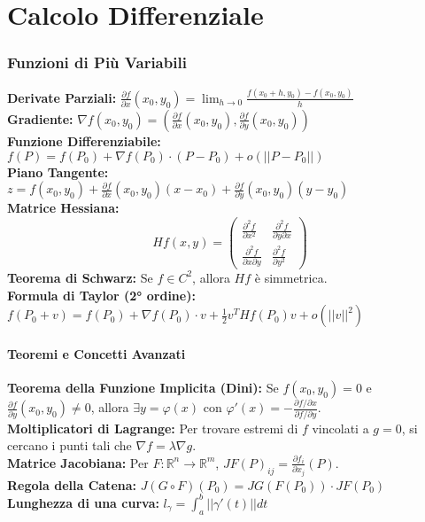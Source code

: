 \documentclass[12pt, a4paper]{article}
\begin{document}
\part{Calcolo Differenziale}

\section{Funzioni di Più Variabili}
\textbf{Derivate Parziali:} $\frac{\partial f}{\partial x}(x_0, y_0) = \lim_{h \to 0} \frac{f(x_0+h, y_0) - f(x_0, y_0)}{h}$  \\
\textbf{Gradiente:} $\nabla f(x_0, y_0) = \left(\frac{\partial f}{\partial x}(x_0, y_0), \frac{\partial f}{\partial y}(x_0, y_0)\right)$  \\
\textbf{Funzione Differenziabile:} $f(P) = f(P_0) + \nabla f(P_0) \cdot (P-P_0) + o(||P-P_0||)$  \\
\textbf{Piano Tangente:} $z = f(x_0, y_0) + \frac{\partial f}{\partial x}(x_0, y_0)(x-x_0) + \frac{\partial f}{\partial y}(x_0, y_0)(y-y_0)$  \\
\textbf{Matrice Hessiana:}
\begin{equation}
Hf(x,y) = \begin{pmatrix} \frac{\partial^2 f}{\partial x^2} & \frac{\partial^2 f}{\partial y \partial x} \\ \frac{\partial^2 f}{\partial x \partial y} & \frac{\partial^2 f}{\partial y^2} \end{pmatrix}
\end{equation}
\textbf{Teorema di Schwarz:} Se $f \in C^2$, allora $Hf$ è simmetrica.  \\
\textbf{Formula di Taylor (2° ordine):} $f(P_0+v) = f(P_0) + \nabla f(P_0) \cdot v + \frac{1}{2}v^T Hf(P_0)v + o(||v||^2)$ 

\subsection{Teoremi e Concetti Avanzati}
\textbf{Teorema della Funzione Implicita (Dini):} Se $f(x_0, y_0)=0$ e $\frac{\partial f}{\partial y}(x_0, y_0) \neq 0$, allora $\exists y = \varphi(x)$ con $\varphi'(x) = - \frac{\partial f/\partial x}{\partial f/\partial y}$.  \\
\textbf{Moltiplicatori di Lagrange:} Per trovare estremi di $f$ vincolati a $g=0$, si cercano i punti tali che $\nabla f = \lambda \nabla g$.  \\
\textbf{Matrice Jacobiana:} Per $F: \mathbb{R}^n \to \mathbb{R}^m$, $JF(P)_{ij} = \frac{\partial f_i}{\partial x_j}(P)$.  \\
\textbf{Regola della Catena:} $J(G \circ F)(P_0) = JG(F(P_0)) \cdot JF(P_0)$  \\
\textbf{Lunghezza di una curva:} $l_\gamma = \int_a^b ||\gamma'(t)|| dt$ 
\end{document}
